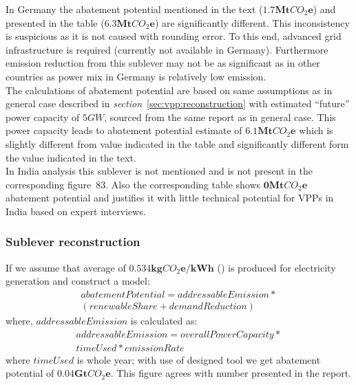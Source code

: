 \documentclass[11pt, twocolumn]{article}
\begin{document}
In Germany the abatement potential mentioned in the text ($\mathbf{1.7} \mathbf{Mt}CO_2\mathbf{e}$) and presented in the table ($\mathbf{6.3} \mathbf{Mt}CO_2\mathbf{e}$) are significantly different. This inconsistency is suspicious as it is not caused with rounding error. To this end, advanced grid infrastructure is required (currently not available in Germany). Furthermore emission reduction from this sublever may not be as significant as in other countries as power mix in Germany is relatively low emission.\\
The calculations of abatement potential are based on same assumptions as in general case described in \emph{section}~\ref{sec:vpp:reconstruction} with estimated ``future'' power capacity of $5GW$, sourced from the same report as in general case. This power capacity leads to abatement potential estimate of $\mathbf{6.1} \mathbf{Mt}CO_2\mathbf{e}$ which is slightly different from value indicated in the table and significantly different form the value indicated in the text.\\

In India analysis this sublever is not mentioned and is not present in the corresponding figure~83. Also the corresponding table shows $\mathbf{0} \mathbf{Mt}CO_2\mathbf{e}$ abatement potential and justifies it with little technical potential for VPPs in India based on expert interviews.


\subsubsection{Sublever reconstruction\label{sec:vpp:reconstruction}}
If we assume that average of $\mathbf{0.534 kg}CO_2\mathbf{e}/\mathbf{kWh}$ (\citep{iea2012co2}) is produced for electricity generation and construct a model:\\
\begin{gather*}
    abatementPotential = addressableEmission * \\ 
    ( renewableShare + demandReduction )
\end{gather*}
where, $addressableEmission$ is calculated as:\\
\begin{gather*}
  addressableEmission = overallPowerCapacity *\\
  timeUsed * emissionRate
\end{gather*}
where $timeUsed$ is whole year; with use of designed tool we get abatement potential of $\mathbf{0.04} \mathbf{Gt}CO_2\mathbf{e}$. This figure agrees with number presented in the report.
\end{document}

